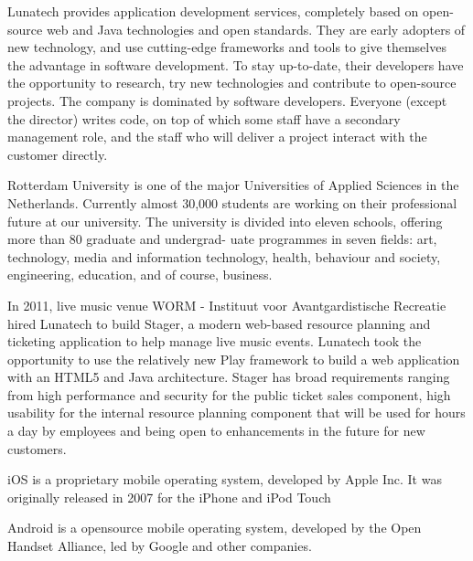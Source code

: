 Lunatech provides application development services, completely based on open-source web and Java technologies and open standards. They are early adopters of new technology, and use cutting-edge frameworks and tools to give themselves the advantage in software development. To stay up-to-date, their developers have the opportunity to research, try new technologies and contribute to open-source projects. The company is dominated by software developers. Everyone (except the director) writes code, on top of which some staff have a secondary management role, and the staff who will deliver a project interact with the customer directly.

Rotterdam University is one of the major Universities of Applied Sciences in the Netherlands. Currently almost 30,000 students are working on their professional future at our university.
The university is divided into eleven schools, offering more than 80 graduate and undergrad- uate programmes in seven fields: art, technology, media and information technology, health, behaviour and society, engineering, education, and of course, business.\cite{HogeschoolRotterdam2012}

In 2011, live music venue WORM - Instituut voor Avantgardistische Recreatie hired Lunatech to build Stager, a modern web-based resource planning and ticketing application to help manage live music events. Lunatech took the opportunity to use the relatively new Play framework to build a web application with an HTML5 and Java architecture. Stager has broad requirements ranging from high performance and security for the public ticket sales component, high usability for the internal resource planning component that will be used for hours a day by employees and being open to enhancements in the future for new customers.


iOS is a proprietary mobile operating system, developed by Apple Inc. It was originally released in 2007 for the iPhone and iPod Touch

Android is a opensource mobile operating system, developed by the Open Handset Alliance, led by Google and other companies.\cite{Inc.2012}

